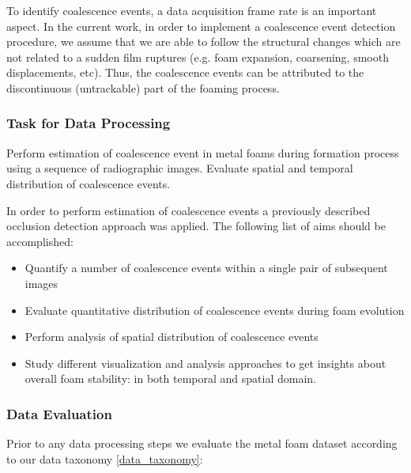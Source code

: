 To identify coalescence events, a data acquisition frame rate is an important aspect. In the current work, in order to implement a coalescence event detection procedure, we assume that we are able to follow the structural changes which are not related to a sudden film ruptures (e.g. foam expansion, coarsening, smooth displacements, etc). Thus, the coalescence events can be  attributed to the discontinuous (untrackable) part of the foaming process.     


\subsubsection{Task for Data Processing}
\label{app_foams_task}

Perform estimation of coalescence event in metal foams during formation process using a sequence of radiographic images. Evaluate spatial and temporal distribution of coalescence events.

In order to perform estimation of coalescence events a previously described occlusion detection approach was applied.
The following list of aims should be accomplished:
\begin{itemize}
	\item Quantify a number of coalescence events within a single pair of subsequent images
	\item Evaluate quantitative distribution of coalescence events during foam evolution
	\item Perform analysis of spatial distribution of coalescence events
	\item Study different visualization and analysis approaches to get insights about overall foam stability: in both temporal and spatial domain. 
\end{itemize}


\subsubsection{Data Evaluation}

Prior to any data processing steps we evaluate the metal foam dataset according to our data taxonomy \ref{data_taxonomy}:

